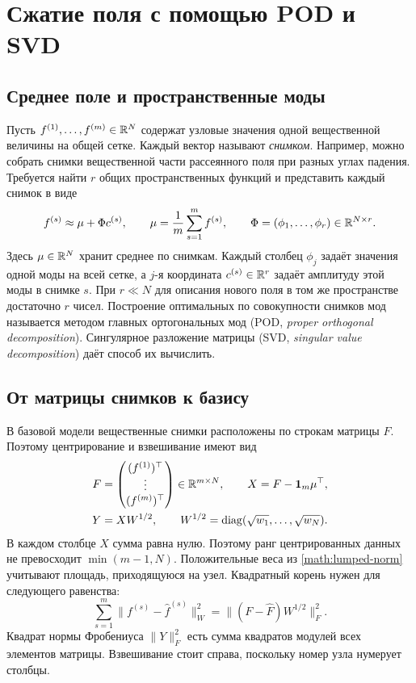\chapter{Сжатие поля с помощью POD и SVD}
\label{math:pod}

\section{Среднее поле и пространственные моды}
Пусть $f^{(1)},\ldots,f^{(m)}\in\mathbb{R}^N$ содержат узловые значения
одной вещественной величины на общей сетке. Каждый вектор называют
\emph{снимком}. Например, можно собрать снимки вещественной части
рассеянного поля при разных углах падения. Требуется найти $r$ общих
пространственных функций и представить каждый снимок в виде
\begin{equation}
 f^{(s)}\approx\mu+\Phi c^{(s)},\qquad
 \mu=\frac1m\sum_{s=1}^m f^{(s)},\qquad
 \Phi=(\phi_1,\ldots,\phi_r)\in\mathbb{R}^{N\times r}.\label{math:pod-expansion}
\end{equation}
Здесь $\mu\in\mathbb{R}^N$ хранит среднее по снимкам. Каждый столбец $\phi_j$
задаёт значения одной моды на всей сетке, а $j$-я координата
$c^{(s)}\in\mathbb{R}^r$ задаёт амплитуду этой моды в снимке $s$.
При $r\ll N$ для описания нового поля в том же пространстве достаточно
$r$ чисел. Построение оптимальных по совокупности снимков мод называется
методом главных ортогональных мод (POD, \emph{proper orthogonal
decomposition}). Сингулярное разложение матрицы (SVD, \emph{singular
value decomposition}) даёт способ их вычислить.

\section{От матрицы снимков к базису}
В базовой модели вещественные снимки расположены по строкам матрицы $F$.
Поэтому центрирование и взвешивание имеют вид
\begin{align}
 F&=\begin{pmatrix}(f^{(1)})^\top\\[-2pt]\vdots\\(f^{(m)})^\top\end{pmatrix}
       \in\mathbb{R}^{m\times N},\qquad
 X=F-\bm1_m\mu^\top,\label{math:row-snapshots}\\
 Y&=XW^{1/2},\qquad
 W^{1/2}=\operatorname{diag}(\sqrt{w_1},\ldots,\sqrt{w_N}).\label{math:weighted-snapshots}
\end{align}
В каждом столбце $X$ сумма равна нулю. Поэтому ранг центрированных данных
не превосходит $\min(m-1,N)$. Положительные веса из
\eqref{math:lumped-norm} учитывают площадь, приходящуюся на узел.
Квадратный корень нужен для следующего равенства:
\begin{equation}
 \sum_{s=1}^m\|f^{(s)}-\widehat f^{(s)}\|_W^2
 =\|(F-\widehat F)W^{1/2}\|_F^2.\label{math:weighted-objective}
\end{equation}
Квадрат нормы Фробениуса $\|Y\|_F^2$ есть сумма квадратов модулей всех
элементов матрицы. Взвешивание стоит справа, поскольку номер узла
нумерует столбцы.

